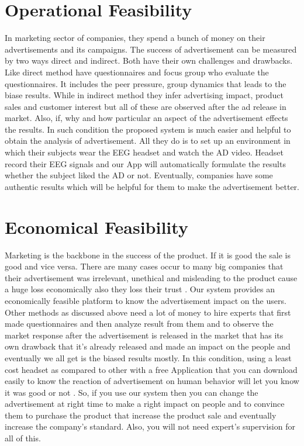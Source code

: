 \documentclass[a4paper, 12pt, oneside]{uet_thesis}
\begin{document}
\section{Operational Feasibility}
In marketing sector of companies, they spend a bunch of money on their advertisements and its campaigns. The success of advertisement can be measured by two ways direct and indirect. Both have their own challenges and drawbacks. Like direct method have questionnaires and focus group who evaluate the questionnaires. It includes the peer pressure, group dynamics that leads to the biase results. While in indirect method they infer advertising impact, product sales and customer interest but all of these are observed after the ad release in market. Also, if, why and how particular an aspect of the advertisement effects the results\cite{b25}. In such condition the proposed system is much easier and helpful to obtain the analysis of advertisement. All they do is to set up an environment in which their subjects wear the EEG headset and watch the AD video. Headset record their EEG signals and our App will automatically formulate the results whether the subject liked the AD or not. Eventually, companies have some authentic results which will be helpful for them to make the advertisement better.

\section{Economical Feasibility}
Marketing is the backbone in the success of the product. If it is good the sale is good and vice versa. There are many cases occur to many big companies that their advertisement was irrelevant, unethical and misleading to the product cause a huge loss economically also they loss their trust \cite{b26} \cite{b27}. Our system provides an economically feasible platform to know the advertisement impact on the users. Other methods as discussed above need a lot of money to hire experts that first made questionnaires and then analyze result from them and to observe the market response after the advertisement is released in the market that has its own drawback that it’s already released and made an impact on the people and eventually we all get is the biased results mostly. In this condition, using a least cost headset\cite{b28} as compared to other with a free Application that you can download easily to know the reaction of advertisement on human behavior will let you know it was good or not\cite{b29} . So, if you use our system then you can change the advertisement at right time to make a right impact on people and to convince them to purchase the product that increase the product sale and eventually increase the company's standard. Also, you will not need expert’s supervision for all of this.
\end{document}
